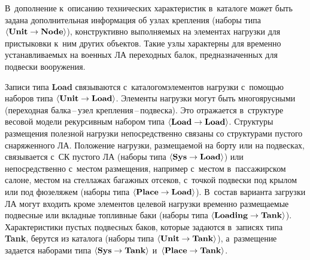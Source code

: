 \begin{multicols}{2}
В~дополнение к~описанию технических 
характеристик в~каталоге может быть задана дополнительная информация об 
узлах крепления (наборы типа 
$\langle \mbox{\textbf{Unit}}\hm\to \mbox{\textbf{Node}}\rangle$), 
конструктивно выполняемых на элементах нагрузки для пристыковки к~ним 
других объектов. Такие узлы характерны для временно устанавливаемых на 
военных ЛА переходных балок, предназначенных для подвески вооружения. 
{

}

Записи типа \textbf{Load} связываются с~каталогом\linebreak элементов нагрузки с~помощью наборов типа 
$\langle \mbox{\textbf{Unit}}\hm \to \mbox{\textbf{Load}}\rangle$. Элементы 
нагрузки могут быть многоярусными (переходная бал\-ка\,--\,узел  
креп\-ле\-ния\,--\,под\-вес\-ка). Это отражается в~структуре весовой модели 
рекурсивным набором типа 
$\langle \mbox{\textbf{Load}}\hm\to \mbox{\textbf{Load}}\rangle$. 
Структуры размещения полезной нагрузки непосредственно связаны со 
структурами пустого снаряженного ЛА. Положение нагрузки, размещаемой на 
борту или на подвесках, связывается с~СК пустого ЛА 
(наборы типа 
$\langle \mbox{\textbf{Sys}}\hm \to \mbox{\textbf{Load}}\rangle$) или 
непосредственно с~местом размещения, например с~местом в~пассажирском 
салоне, местом на стеллажах багажных отсеков, с~точкой подвески под крылом 
или под фюзеляжем (наборы типа 
$\langle \mbox{\textbf{Place}}\hm \to \mbox{\textbf{Load}}\rangle$). 
В~состав варианта загрузки ЛА могут входить кроме элементов целевой 
нагрузки временно размещаемые подвесные или вкладные топливные баки 
(наборы типа 
$\langle \mbox{\textbf{Loading}}\hm \to\mbox{\textbf{Tank}}\rangle$). 
Характеристики пустых подвесных баков, которые задаются в~записях типа 
\textbf{Tank}, берутся из каталога (наборы типа 
$\langle \mbox{\textbf{Unit}}\hm \to \mbox{\textbf{Tank}}\rangle$), 
а~размещение задается наборами типа 
$\langle \mbox{\textbf{Sys}}\hm \to\mbox{\textbf{Tank}}\rangle$ 
и~$\langle \mbox{\textbf{Place}}\hm \to \mbox{\textbf{Tank}}\rangle$.


\begin{figure*}[b] %
   \vspace*{6pt}
  \begin{center}
    \mbox{%
 \epsfxsize=147.507mm 
 }
\end{center}
\vspace*{-6pt}
  \end{figure*}
  

\end{multicols}
